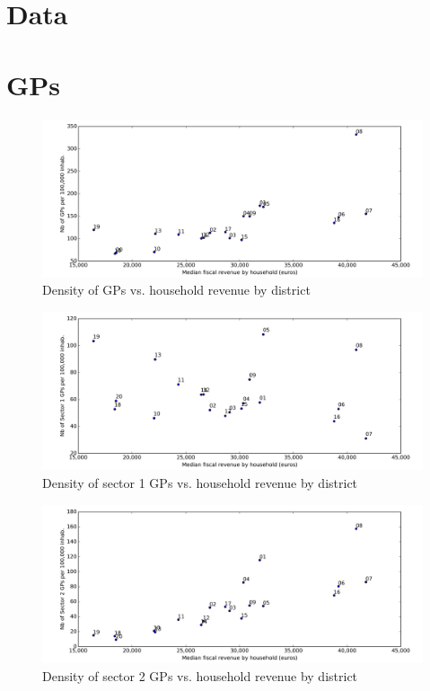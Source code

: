 \documentclass[11pt]{article}
\begin{document}
\section{Data}

\section{GPs}

\begin{figure}[H]
    \caption{Density of GPs vs. household revenue by district}
	\centering
		\includegraphics[width=16cm]{images/GP_Ardt_DensityVsRevenue.png}
\end{figure}

\begin{figure}[H]
    \caption{Density of sector 1 GPs vs. household revenue by district}
	\centering
		\includegraphics[width=16cm]{images/GP_Ardt_DensityS1VsRevenue.png}
\end{figure}

\begin{figure}[H]
    \caption{Density of sector 2 GPs vs. household revenue by district}
	\centering
		\includegraphics[width=16cm]{images/GP_Ardt_DensityS2VsRevenue.png}
\end{figure}
\end{document}
